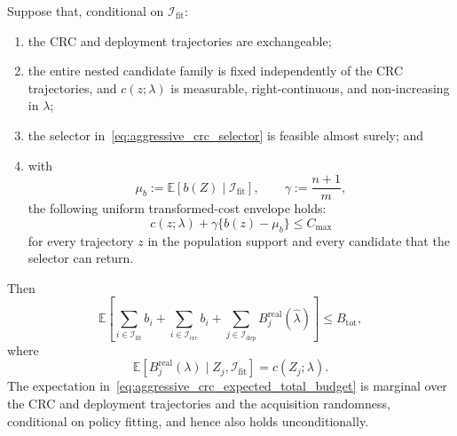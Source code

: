 \begin{proposition}
\label{prop:aggressive_crc_budget_validity}
Suppose that, conditional on $\mathcal I_{\mathrm{fit}}$:
\begin{enumerate}
    \item the CRC and deployment trajectories are exchangeable;
    \item the entire nested candidate family is fixed independently of the
    CRC trajectories, and $c(z;\lambda)$ is measurable, right-continuous, and
    non-increasing in $\lambda$;
    \item the selector in~\eqref{eq:aggressive_crc_selector} is feasible
    almost surely; and
    \item with
    \[
        \mu_b
        :=\mathbb E[b(Z)\mid\mathcal I_{\mathrm{fit}}],
        \qquad
        \gamma:=\frac{n+1}{m},
    \]
    the following uniform transformed-cost envelope holds:
    \begin{equation}
    \label{eq:aggressive_crc_transformed_envelope}
        c(z;\lambda)
        +\gamma\{b(z)-\mu_b\}
        \leq C_{\max}
    \end{equation}
    for every trajectory $z$ in the population support and every candidate
    that the selector can return.
\end{enumerate}
Then
\begin{equation}
\label{eq:aggressive_crc_expected_total_budget}
    \mathbb E\!\left[
        \sum_{i\in\mathcal I_{\mathrm{fit}}}b_i
        +\sum_{i\in\mathcal I_{\mathrm{crc}}}b_i
        +\sum_{j\in\mathcal I_{\mathrm{dep}}}
            B^{\mathrm{real}}_j(\widehat\lambda)
    \right]
    \leq B_{\mathrm{tot}},
\end{equation}
where
\[
    \mathbb E\!\left[
        B^{\mathrm{real}}_j(\lambda)
        \mid Z_j,\mathcal I_{\mathrm{fit}}
    \right]
    =c(Z_j;\lambda).
\]
The expectation in~\eqref{eq:aggressive_crc_expected_total_budget} is
marginal over the CRC and deployment trajectories and the acquisition
randomness, conditional on policy fitting, and hence also holds
unconditionally.
\end{proposition}


